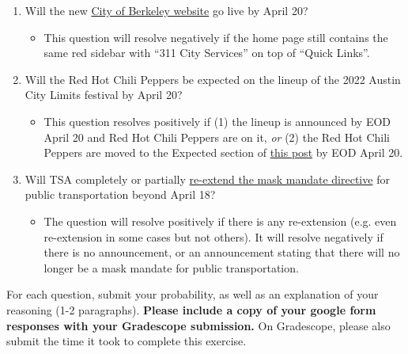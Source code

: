 \documentclass[11pt]{article}
\begin{document}
\begin{enumerate}
	\item Will the new \href{https://www.cityofberkeley.info/Home.aspx}{City of Berkeley website} go live by April 20?
	\begin{itemize}
		\item This question will resolve negatively if the home page still contains the same red sidebar with ``311 City Services'' on top of ``Quick Links''.
	\end{itemize} 
	\item Will the Red Hot Chili Peppers be expected on the lineup of the 2022 Austin City Limits festival by April 20?
	\begin{itemize}
		\item This question resolves positively if (1) the lineup is announced by EOD April 20 and Red Hot Chili Peppers are on it, \emph{or} (2) the Red Hot Chili Peppers are moved to the Expected section of \href{https://www.reddit.com/r/aclfestival/comments/s6izhl/official_acl_2022_lineup_speculation_thread/}{this post} by EOD April 20.
	\end{itemize}
	\item Will TSA completely or partially \href{https://www.tsa.gov/news/press/statements/2022/03/10/statement-regarding-face-mask-use-public-transportation}{re-extend the mask mandate directive} for public transportation beyond April 18?
	\begin{itemize}
		\item The question will resolve positively if there is any re-extension (e.g. even re-extension in some cases but not others). It will resolve negatively if there is no announcement, or an announcement stating that there will no longer be a mask mandate for public transportation.
	\end{itemize}
\end{enumerate}

For each question, submit your probability, as well as an explanation of your reasoning (1-2 paragraphs). \textbf{Please include a copy of your google form responses with your Gradescope submission.} On Gradescope, please also submit the time it took to complete this exercise.
\end{document}
